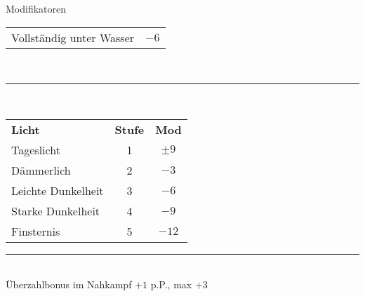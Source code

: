 \documentclass[a4paper, 11pt]{article}
\begin{document}
\begin{multicols}{3}
\begin{spmbox}{Modifikatoren}
\begin{tabularx}{\linewidth}{X c}
                Vollständig unter Wasser & $-6$ \\
        \end{tabularx}\\
        \rule{\linewidth}{.2em}\\
        \begin{tabularx}{\linewidth}{X c c}
                \rowcolor{spmtabelle2}
                \textbf{Licht} & \textbf{Stufe} & \textbf{Mod} \\
                Tageslicht & 1 & $\pm 9$ \\
                Dämmerlich & 2 & $-3$ \\
                Leichte Dunkelheit & 3 & $-6$\\
                Starke Dunkelheit & 4 & $-9$\\
                Finsternis & 5 & $-12$\\
        \end{tabularx}
        \rule{\linewidth}{.2em}\\
        Überzahlbonus im Nahkampf $+1$ p.P., max $+3$
\end{spmbox}
\end{multicols}
\newpage
\end{document}
